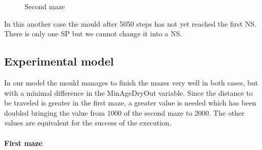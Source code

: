 \begin{figure}[H]
    \centering
    \caption{Second maze}
    \label{fig:foobar}
\end{figure}

In this another case the mould after 5050 steps has not yet reached the first NS. There is only one SP but we cannot change it into a NS.

\subsection{Experimental model}
\label{experimental_model}

In our model the mould manages to finish the mazes very well in both cases, but with a minimal difference in the MinAgeDryOut variable. Since the distance to be traveled is greater in the first maze, a greater value is needed which has been doubled bringing the value from 1000 of the second maze to 2000. The other values are equivalent for the success of the execution.

\paragraph{First maze}

